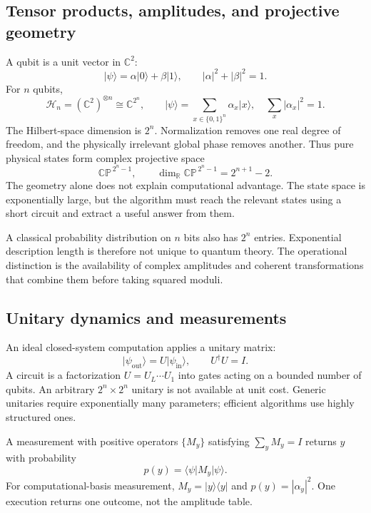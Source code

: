 \documentclass[11pt,a4paper]{article}
\newcommand{\ket}[1]{\lvert #1\rangle}
\newcommand{\bra}[1]{\langle #1\rvert}
\newcommand{\C}{\mathbb C}
\newcommand{\R}{\mathbb R}
\theoremstyle{definition}
\theoremstyle{remark}
\numberwithin{equation}{section}
\begin{document}
\subsection{Tensor products, amplitudes, and projective geometry}
A qubit is a unit vector in $\C^2$:
\begin{equation}
 \ket{\psi}=\alpha\ket{0}+\beta\ket{1},\qquad
 |\alpha|^2+|\beta|^2=1.
\end{equation}
For $n$ qubits,
\begin{equation}\label{eq:hilbert}
 \mathcal H_n=(\C^2)^{\otimes n}\cong\C^{2^n},\qquad
 \ket{\psi}=\sum_{x\in\{0,1\}^n}\alpha_x\ket{x},\quad
 \sum_x|\alpha_x|^2=1.
\end{equation}
The Hilbert-space dimension is $2^n$. Normalization removes one real degree
of freedom, and the physically irrelevant global phase removes another.
Thus pure physical states form complex projective space
\begin{equation}
 \mathbb{CP}^{\,2^n-1},\qquad
 \dim_{\R}\mathbb{CP}^{\,2^n-1}=2^{n+1}-2.
\end{equation}
The geometry alone does not explain computational advantage. The state space is exponentially large, but the algorithm must
reach the relevant states using a short circuit and extract a useful answer
from them.

A classical probability distribution on $n$ bits also has $2^n$ entries.
Exponential description length is therefore not unique to quantum theory.
The operational distinction is the availability of complex amplitudes and
coherent transformations that combine them before taking squared moduli.

\subsection{Unitary dynamics and measurements}
An ideal closed-system computation applies a unitary matrix:
\begin{equation}
 \ket{\psi_{\mathrm{out}}}=U\ket{\psi_{\mathrm{in}}},\qquad U^\dagger U=I.
\end{equation}
A circuit is a factorization $U=U_L\cdots U_1$ into gates acting on a bounded
number of qubits. An arbitrary $2^n\times2^n$ unitary is not available at unit
cost. Generic unitaries require exponentially many parameters; efficient
algorithms use highly structured ones.

A measurement with positive operators $\{M_y\}$ satisfying $\sum_yM_y=I$
returns $y$ with probability
\begin{equation}\label{eq:born}
 p(y)=\bra{\psi}M_y\ket{\psi}.
\end{equation}
For computational-basis measurement, $M_y=\ket{y}\bra{y}$ and
$p(y)=|\alpha_y|^2$. One execution returns one outcome, not the amplitude
table.
\end{document}
